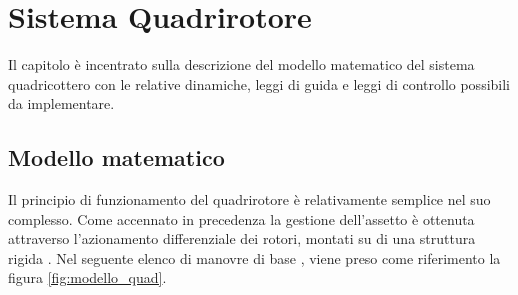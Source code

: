\chapter{Sistema Quadrirotore}
Il capitolo è incentrato sulla descrizione del modello matematico del sistema quadricottero con le relative dinamiche, leggi di guida e leggi di controllo possibili da implementare.
\section{Modello matematico}
Il principio di funzionamento del quadrirotore è relativamente semplice nel suo complesso. Come accennato in precedenza la gestione dell'assetto è ottenuta attraverso l'azionamento differenziale dei rotori, montati su di una struttura rigida \cite{modelquad}.
Nel seguente elenco di manovre di base , viene preso come riferimento la figura \ref{fig:modello_quad}.
